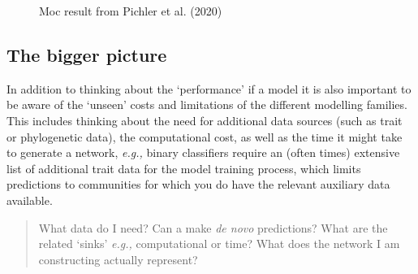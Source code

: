 \documentclass[
]{article}
\begin{document}
\begin{figure}


\caption{\label{fig-pichler}Moc result from Pichler et al. (2020)}

\end{figure}%

\subsection{The bigger picture}\label{the-bigger-picture}

In addition to thinking about the `performance' if a model it is also
important to be aware of the `unseen' costs and limitations of the
different modelling families. This includes thinking about the need for
additional data sources (such as trait or phylogenetic data), the
computational cost, as well as the time it might take to generate a
network, \emph{e.g.,} binary classifiers require an (often times)
extensive list of additional trait data for the model training process,
which limits predictions to communities for which you do have the
relevant auxiliary data available.

\begin{quote}
What data do I need? Can a make \emph{de novo} predictions? What are the
related `sinks' \emph{e.g.,} computational or time? What does the
network I am constructing actually represent?
\end{quote}
\end{document}
